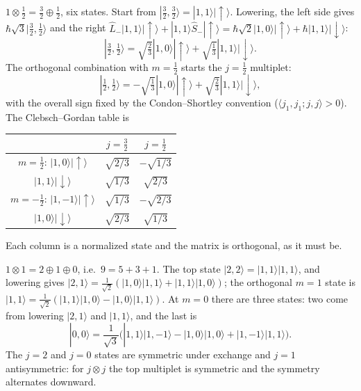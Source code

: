 \begin{example}
$1\otimes\frac12 = \frac32\oplus\frac12$, six states. Start from $|\tfrac32,\tfrac32\rangle = |1,1\rangle|{\uparrow}\rangle$. Lowering, the left side gives $\hbar\sqrt3|\tfrac32,\tfrac12\rangle$ and the right $\hat{L}_-|1,1\rangle|{\uparrow}\rangle + |1,1\rangle\hat{S}_-|{\uparrow}\rangle = \hbar\sqrt2|1,0\rangle|{\uparrow}\rangle + \hbar|1,1\rangle|{\downarrow}\rangle$:
\[
    |\tfrac32,\tfrac12\rangle = \sqrt{\tfrac23}|1,0\rangle|{\uparrow}\rangle + \sqrt{\tfrac13}|1,1\rangle|{\downarrow}\rangle .
\]
The orthogonal combination with $m = \frac12$ starts the $j = \frac12$ multiplet:
\[
    |\tfrac12,\tfrac12\rangle = -\sqrt{\tfrac13}|1,0\rangle|{\uparrow}\rangle + \sqrt{\tfrac23}|1,1\rangle|{\downarrow}\rangle ,
\]
with the overall sign fixed by the Condon--Shortley convention ($\langle j_1,j_1;j,j\rangle>0$). The Clebsch--Gordan table is
\begin{center}
\renewcommand{\arraystretch}{1.4}
\begin{tabular}{c|cc}
    & $j=\frac32$ & $j=\frac12$\\\hline
    $m=\frac12$: $|1,0\rangle|{\uparrow}\rangle$ & $\sqrt{2/3}$ & $-\sqrt{1/3}$\\
    \phantom{$m=\frac12$:} $|1,1\rangle|{\downarrow}\rangle$ & $\sqrt{1/3}$ & $\sqrt{2/3}$\\
    $m=-\frac12$: $|1,-1\rangle|{\uparrow}\rangle$ & $\sqrt{1/3}$ & $-\sqrt{2/3}$\\
    \phantom{$m=-\frac12$:} $|1,0\rangle|{\downarrow}\rangle$ & $\sqrt{2/3}$ & $\sqrt{1/3}$
\end{tabular}
\end{center}
Each column is a normalized state and the matrix is orthogonal, as it must be.
\end{example}

\begin{example}
$1\otimes1 = 2\oplus1\oplus0$, i.e.\ $9 = 5+3+1$. The top state $|2,2\rangle = |1,1\rangle|1,1\rangle$, and lowering gives $|2,1\rangle = \frac{1}{\sqrt2}(|1,0\rangle|1,1\rangle + |1,1\rangle|1,0\rangle)$; the orthogonal $m = 1$ state is $|1,1\rangle = \frac{1}{\sqrt2}(|1,1\rangle|1,0\rangle - |1,0\rangle|1,1\rangle)$. At $m = 0$ there are three states: two come from lowering $|2,1\rangle$ and $|1,1\rangle$, and the last is
\[
    |0,0\rangle = \frac{1}{\sqrt3}\bigl(|1,1\rangle|1,-1\rangle - |1,0\rangle|1,0\rangle + |1,-1\rangle|1,1\rangle\bigr).
\]
The $j = 2$ and $j = 0$ states are symmetric under exchange and $j = 1$ antisymmetric: for $j\otimes j$ the top multiplet is symmetric and the symmetry alternates downward.
\end{example}

